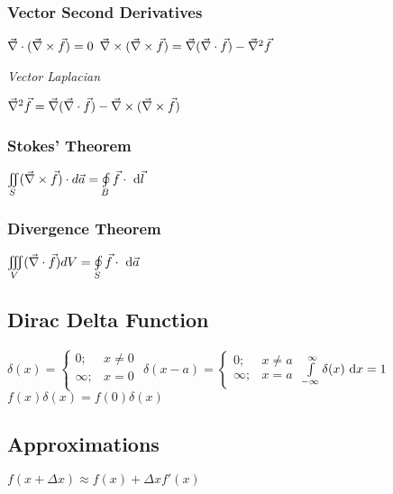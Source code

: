 \subsubsection{Vector Second Derivatives}

\begin{itemize}
\itemt \(\vec{\nabla}\cdot(\vec{\nabla}\times\vec{f}) = 0\)
\itemt \( \vec{\nabla}\times(\vec{\nabla}\times\vec{f}) = \vec{\nabla}(\vec{\nabla}\cdot\vec{f})-\vec{\nabla}^2\vec{f}\)
\end{itemize}

\textit{Vector Laplacian}
\begin{itemize}
\itemt \( \vec{\nabla}^2 \vec{f} = \vec{\nabla} (\vec{\nabla}\cdot\vec{f}) - \vec{\nabla}\times (\vec{\nabla}\times\vec{f})\)
\end{itemize}


\subsubsection{Stokes' Theorem}
\begin{itemize}
\itemt \( \iint\limits_{S} (\vec{\nabla}\times{\vec{f}})\cdot d\vec{a} = \oint\limits_{B} \vec{f}\cdot \ \mathrm{d}\vec{l} \)
\end{itemize}


\subsubsection{Divergence Theorem}
\begin{itemize}
\itemt \( \iiint\limits_{V} (\vec{\nabla}\cdot{\vec{f}}) dV = \oint\limits_{S} \vec{f}\cdot \ \mathrm{d}\vec{a} \)
\end{itemize}


\subsection{Dirac Delta Function}
\begin{itemize}
\itemt  \( \delta(x) = \begin{cases} 
      0; & x\neq 0 \\
      \infty; & x= 0 \\
   \end{cases}
\)
\itemt  \( \delta(x-a) = \begin{cases} 
      0; & x\neq a \\
      \infty; & x= a \\
   \end{cases}
\)
\itemt \( \int\limits_{-\infty}^{\infty} \delta(x) \ \mathrm{d}x = 1\)
\itemt \( f(x)\delta(x) = f(0)\delta(x) \)
\end{itemize}


\subsection{Approximations}
\begin{itemize}
\itemt \( f(x+\Delta x) \approx f(x) + \Delta x f'(x) \)
\end{itemize}
